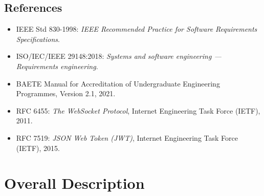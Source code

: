 \documentclass[10.5pt,a4paper]{article}
\begin{document}
\subsection{References}
\begin{itemize}[leftmargin=*]
    \item IEEE Std 830-1998: \textit{IEEE Recommended Practice for Software Requirements Specifications}.
    \item ISO/IEC/IEEE 29148:2018: \textit{Systems and software engineering --- Requirements engineering}.
    \item BAETE Manual for Accreditation of Undergraduate Engineering Programmes, Version 2.1, 2021.
    \item RFC 6455: \textit{The WebSocket Protocol}, Internet Engineering Task Force (IETF), 2011.
    \item RFC 7519: \textit{JSON Web Token (JWT)}, Internet Engineering Task Force (IETF), 2015.
\end{itemize}

\clearpage

\section{Overall Description}
\end{document}
